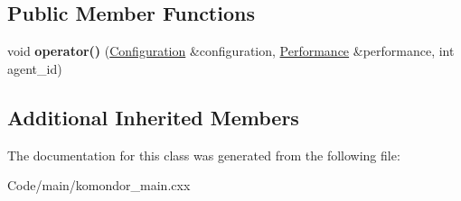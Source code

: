 \subsection*{Public Member Functions}
\begin{DoxyCompactItemize}
\item 
\mbox{\label{classcompcxx__Agent__25_1_1my__Agent__outportAnswerToController__f__t_a65476062df948030dc8bb07c46e91a3c}} 
void {\bfseries operator()} (\hyperlink{structConfiguration}{Configuration} \&configuration, \hyperlink{structPerformance}{Performance} \&performance, int agent\+\_\+id)
\end{DoxyCompactItemize}
\subsection*{Additional Inherited Members}


The documentation for this class was generated from the following file\+:\begin{DoxyCompactItemize}
\item 
Code/main/komondor\+\_\+main.\+cxx\end{DoxyCompactItemize}
